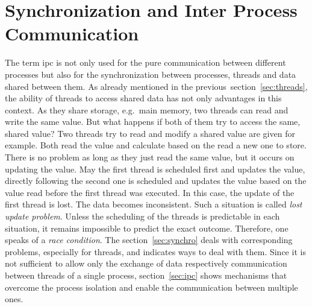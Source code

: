 \section{Synchronization and Inter Process Communication}\label{sec:ipc-and-synchro}
The term \acf{ipc} is not only used for the pure communication between different processes but also for the synchronization between processes, threads and data shared between them.
As already mentioned in the previous~section~\ref{sec:threads}, the ability of threads to access shared data has not only advantages in this context.
As they share storage, e.g.\ main memory, two threads can read and write the same value.
But what happens if both of them try to access the same, shared value?
Two threads try to read and modify a shared value are given for example.
Both read the value and calculate based on the read a new one to store. 
There is no problem as long as they just read the same value, but it occurs on updating the value.
May the first thread is scheduled first and updates the value, directly following the second one is scheduled and updates the value based on the value read before the first thread was executed.
In this case, the update of the first thread is lost. 
The data becomes inconsistent.
Such a situation is called \textit{lost update problem}\cite{glatz2015betriebssysteme}.
Unless the scheduling of the threads is predictable in each situation, it remains impossible to predict the exact outcome.
Therefore, one speaks of a \textit{race condition}\cite{tanenbaum-modern-operating-systems}.
The section~\ref{sec:synchro} deals with corresponding problems, especially for threads, and indicates ways to deal with them.
Since it is not sufficient to allow only the exchange of data respectively communication between threads of a single process, section~\ref{sec:ipc} shows mechanisms that overcome the process isolation and enable the communication between multiple ones.

